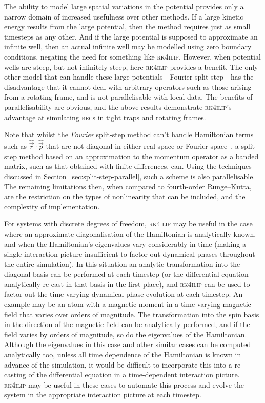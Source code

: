 The ability to model large spatial variations in the potential provides only a narrow domain of increased usefulness over other methods. If a large kinetic energy results from the large potential, then the method requires just as small timesteps as any other. And if the large potential is supposed to approximate an infinite well, then an actual infinite well may be modelled using zero boundary conditions, negating the need for something like \textsc{rk4ilip}. However, when potential wells are steep, but not infinitely steep, here \textsc{rk4ilip} provides a benefit. The only other model that can handle these large potentials---Fourier split-step---has the disadvantage that it cannot deal with arbitrary operators such as those arising from a rotating frame, and is not parallelisable with local data. The benefits of parallelisability are obvious, and the above results demonstrate \textsc{rk4ilip}'s advantage at simulating \textsc{bec}s in tight traps and rotating frames.

Note that whilst the \emph{Fourier} split-step method can't handle Hamiltonian terms such as $\hat {\vec r} \cdot \hat {\vec p}$ that are not diagonal in either real space or Fourier space~\cite[p.~315]{tannor_introduction_2007}, a split-step method based on an approximation to the momentum operator as a banded matrix, such as that obtained with finite differences, can. Using the techniques discussed in Section~\ref{sec:split-step-parallel}, such a scheme is also parallelisable. The remaining limitations then, when compared to fourth-order Runge--Kutta, are the restriction on the types of nonlinearity that can be included, and the complexity of implementation.

For systems with discrete degrees of freedom, \textsc{rk4ilip} may be useful in the case where an approximate diagonalisation of the Hamiltonian is analytically known, and when the Hamiltonian's eigenvalues vary considerably in time (making a single interaction picture insufficient to factor out dynamical phases throughout the entire simulation). In this situation an analytic transformation into the diagonal basis can be performed at each timestep (or the differential equation analytically re-cast in that basis in the first place), and \textsc{rk4ilip} can be used to factor out the time-varying dynamical phase evolution at each timestep. An example may be an atom with a magnetic moment in a time-varying magnetic field that varies over orders of magnitude. The transformation into the spin basis in the direction of the magnetic field can be analytically performed, and if the field varies by orders of magnitude, so do the eigenvalues of the Hamiltonian. Although the eigenvalues in this case and other similar cases can be computed analytically too, unless all time dependence of the Hamiltonian is known in advance of the simulation, it would be difficult to incorporate this into a re-casting of the differential equation in a time-dependent interaction picture. \textsc{rk4ilip} may be useful in these cases to automate this process and evolve the system in the appropriate interaction picture at each timestep.

